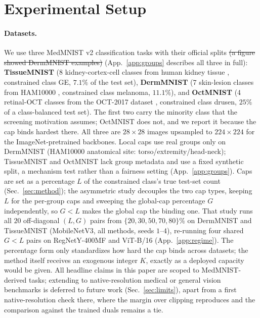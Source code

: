\documentclass[10pt]{article}
\newcommand{\del}[1]{{\color{red}\sout{#1}}}
\newcommand{\rev}[1]{{\color{blue}#1}}
\begin{document}
\section{Experimental Setup}
\label{sec:setup}

\paragraph{Datasets.}
We use three MedMNIST v2 \citep{yang2023medmnist} classification tasks with
their official splits \del{(a figure showed DermMNIST examples)}%
{\color{blue}(App.~\ref{app:groups} describes all three in full)}:
\textbf{TissueMNIST} (8 \rev{kidney-cortex-cell} classes \rev{from human kidney
tissue \citep{woloshuk2021situ}}, constrained class GE, $7.1\%$ of the
test set), \textbf{DermMNIST} (7 skin-lesion classes from
HAM10000 \citep{tschandl2018ham10000}, constrained class melanoma,
$11.1\%$), and \textbf{OctMNIST} (4 retinal-OCT classes \rev{from the
OCT-2017 dataset \citep{kermany2018identifying}}, constrained class
drusen, $25\%$ of a class-balanced test set). The first two carry the minority class that
the screening motivation assumes; OctMNIST does not, and we report it
because the cap binds hardest there. All three are $28{\times}28$ images
upsampled to $224{\times}224$ for the ImageNet-pretrained backbones. Local
caps use real groups only on DermMNIST (HAM10000 anatomical site:
torso/extremity/head-neck); TissueMNIST and OctMNIST lack group metadata and
use a fixed synthetic split, a mechanism test rather than a fairness
setting (App.~\ref{app:groups}). Caps are set as a percentage $L$ of the
constrained class's true test-set count (Sec.~\ref{sec:method}); the
asymmetric study decouples the two cap types, keeping $L$ for the per-group
caps and sweeping the global-cap percentage $G$ independently, so $G{<}L$
makes the global cap the binding one. That study runs all $20$ off-diagonal
$(L,G)$ pairs from $\{20,30,50,70,80\}\%$ on DermMNIST and TissueMNIST
(MobileNetV3, all methods, seeds $1$--$4$), re-running four shared $G{<}L$
pairs on RegNetY-400MF and ViT-B/16 (App.~\ref{app:regime}). The
percentage form only standardizes how hard the cap binds across datasets;
the method itself receives an exogenous integer $K$, exactly as a deployed
capacity would be given. All headline claims in this paper are scoped to
MedMNIST-derived tasks; extending to native-resolution medical or general
vision benchmarks is deferred to future work (Sec.~\ref{sec:limits})\rev{,
apart from a first native-resolution check there, where the margin over clipping
reproduces and the comparison against the trained duals remains a tie}.
\end{document}
